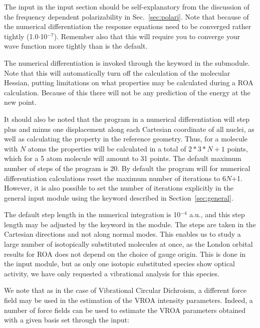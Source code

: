 The input in the  input section should be
self-explanatory from the discussion of the frequency dependent
polarizability in Sec.~\ref{sec:polari}. Note
that because of the numerical differentiation the response equations need to be converged 
rather tightly (1.0$\cdot$10$^{-7}$). Remember also that this will
require you to converge your wave function more
tightly than is the default. 

The numerical differentiation is
invoked through the keyword 
 in the  submodule. Note that this will
automatically 
turn off the calculation of the molecular Hessian,
putting limitations 
on what properties may be calculated during a ROA calculation. Because
of this there will not be any prediction of the energy at the new
point.

It should also be noted that the program in a numerical differentiation will
step plus and minus one displacement along each Cartesian
coordinate
of all nuclei, as well as calculating the property in the reference
geometry. Thus, for a molecule with $N$ atoms the properties will be
calculated in a total of $2*3*N + 1$ points, which for a 5 atom 
molecule will amount to 31 points. The default maximum number of steps
of the program is 20. By default the program will for numerical
differentiation calculations reset the maximum number of iterations to
6$N$+1. However, it is also possible to set the number of iterations
explicitly  in the general input module using the keyword 
described in Section~\ref{sec:general}.

The default step length in the numerical integration is 10$^{-4}$
a.u., and this step length may be adjusted by the keyword
 in the  module. The steps are taken in
the Cartesian directions and 
not along normal modes. This enables us to study a
large number of 
isotopically substituted molecules at
once, as the London orbital 
results for ROA does not depend on the choice of gauge origin. This is
done in the  input module, but as only one isotopic
substituted species show optical activity, we have only requested a
vibrational analysis for this species.

We note that as in the case of Vibrational Circular Dichroism, a different
force field may be used in the estimation of the VROA intensity
parameters. Indeed, a number of force fields can be used to estimate
the VROA parameters obtained with a given basis set through the input:

